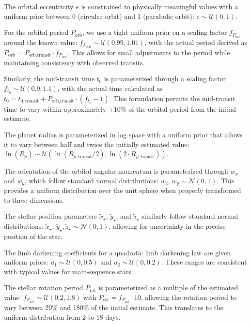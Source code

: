 \documentclass[twocolumn]{aastex631}
\begin{document}
The orbital eccentricity $e$ is constrained to physically meaningful values with a uniform prior between 0 (circular orbit) and 1 (parabolic orbit): 
$e \sim \mathcal{U}(0, 1)$.

For the orbital period $P_{\text{orb}}$, we use a tight uniform prior on a scaling factor $f_{P_{\text{orb}}}$ around the known value: 
$f_{P_{\text{orb}}} \sim \mathcal{U}(0.99, 1.01)$, with the actual period derived as $P_{\text{orb}} = P_{\text{orb,transit}} \cdot f_{P_{\text{orb}}}$. 
This allows for small adjustments to the period while maintaining consistency with observed transits.

Similarly, the mid-transit time $t_0$ is parameterized through a scaling factor $f_{t_0} \sim \mathcal{U}(0.9, 1.1)$, 
with the actual time calculated as $t_0 = t_{0,\text{transit}} + P_{\text{orb,transit}} \cdot (f_{t_0} - 1)$. 
This formulation permits the mid-transit time to vary within approximately $\pm10\%$ of the orbital period from the initial estimate.

The planet radius is parameterized in log space with a uniform prior that allows it to vary between half and twice the 
initially estimated value: $\ln(R_p) \sim \mathcal{U}(\ln(R_{p,\text{transit}}/2), \ln(2 \cdot R_{p,\text{transit}}))$.

The orientation of the orbital angular momentum is parameterized through $w_x$ and $w_y$, which follow standard normal 
distributions: $w_x, w_y \sim \mathcal{N}(0, 1)$. 
This provides a uniform distribution over the unit sphere when properly transformed to three dimensions.

The stellar position parameters $\tilde{x}_{\star}$, $\tilde{y}_{\star}$, and $\tilde{z}_{\star}$ similarly follow standard normal 
distributions: $\tilde{x}_{\star}$, $\tilde{y}_{\star},\tilde{z}_{\star} \sim \mathcal{N}(0, 1)$, allowing for uncertainty in the precise position 
of the star.

The limb darkening coefficients for a quadratic limb darkening law are given uniform priors: 
$u_1 \sim \mathcal{U}(0, 0.5)$ and $u_2 \sim \mathcal{U}(0, 0.2)$. These ranges are consistent with typical values 
for main-sequence stars.

The stellar rotation period $P_{\text{rot}}$ is parameterized as a multiple of the estimated 
value: $f_{P_{\text{rot}}} \sim \mathcal{U}(0.2, 1.8)$ with $P_{\text{rot}} = f_{P_{\text{rot}}} 
\cdot 10$, allowing the rotation period to vary between 20\% and 180\% of the initial estimate. This translates to the uniform 
distribution from 2 to 18 days.
\end{document}
